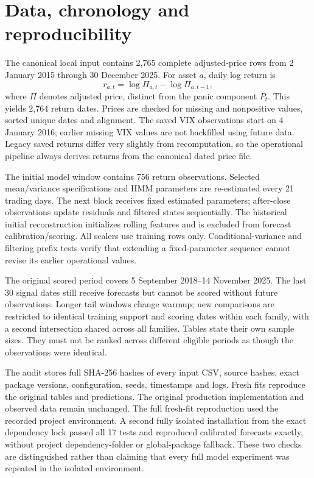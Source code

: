 \documentclass[11pt]{article}
\begin{document}
\section{Data, chronology and reproducibility}
The canonical local input contains 2,765 complete adjusted-price rows from 2 January 2015 through
30 December 2025. For asset $a$, daily log return is
\begin{equation}r_{a,t}=\log \Pi_{a,t}-\log \Pi_{a,t-1},\end{equation}
where $\Pi$ denotes adjusted price, distinct from the panic component $P_t$.
This yields 2,764 return dates. Prices are checked for missing and nonpositive values, sorted unique
dates and alignment. The saved VIX observations start on 4 January 2016; earlier missing VIX values
are not backfilled using future data. Legacy saved returns differ very slightly from recomputation,
so the operational pipeline always derives returns from the canonical dated price file.

The initial model window contains 756 return observations. Selected mean/variance specifications and
HMM parameters are re-estimated every 21 trading days. The next block receives fixed estimated
parameters; after-close observations update residuals and filtered states sequentially. The historical
initial reconstruction initializes rolling features and is excluded from forecast calibration/scoring.
All scalers use training rows only. Conditional-variance and filtering prefix tests verify that extending
a fixed-parameter sequence cannot revise its earlier operational values.

The original scored period covers 5 September 2018--14 November 2025. The last 30 signal dates still
receive forecasts but cannot be scored without future observations. Longer tail windows change warmup;
new comparisons are restricted to identical training support and scoring dates within each family, with
a second intersection shared across all families. Tables state their own sample sizes. They must not be
ranked across different eligible periods as though the observations were identical.

The audit stores full SHA-256 hashes of every input CSV, source hashes, exact package versions,
configuration, seeds, timestamps and logs. Fresh fits reproduce the original tables and predictions.
The original production implementation and observed data remain unchanged. The full fresh-fit
reproduction used the recorded project environment. A second fully isolated installation from
the exact dependency lock passed all 17 tests and reproduced calibrated forecasts exactly,
without project dependency-folder or global-package fallback. These two checks are distinguished
rather than claiming that every full model experiment was repeated in the isolated environment.
\end{document}
